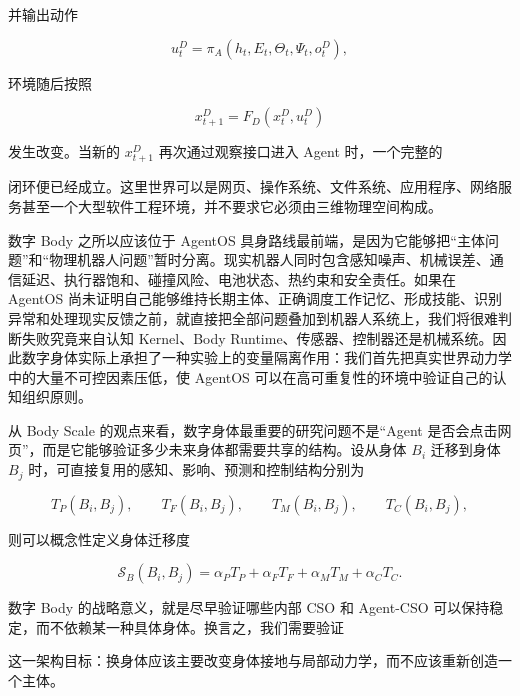 并输出动作

$$
u_t^{D}=\pi_A(h_t,E_t,\Theta_t,\Psi_t,o_t^{D}),
$$

环境随后按照

$$
x_{t+1}^{D}=F_D(x_t^{D},u_t^{D})
$$

发生改变。当新的 $x_{t+1}^{D}$ 再次通过观察接口进入 Agent 时，一个完整的

\begin{statementbox}
\centering
{}
\end{statementbox}

闭环便已经成立。这里世界可以是网页、操作系统、文件系统、应用程序、网络服务甚至一个大型软件工程环境，并不要求它必须由三维物理空间构成。

数字 Body 之所以应该位于 AgentOS 具身路线最前端，是因为它能够把“主体问题”和“物理机器人问题”暂时分离。现实机器人同时包含感知噪声、机械误差、通信延迟、执行器饱和、碰撞风险、电池状态、热约束和安全责任。如果在 AgentOS 尚未证明自己能够维持长期主体、正确调度工作记忆、形成技能、识别异常和处理现实反馈之前，就直接把全部问题叠加到机器人系统上，我们将很难判断失败究竟来自认知 Kernel、Body Runtime、传感器、控制器还是机械系统。因此数字身体实际上承担了一种实验上的变量隔离作用：我们首先把真实世界动力学中的大量不可控因素压低，使 AgentOS 可以在高可重复性的环境中验证自己的认知组织原则。

从 Body Scale 的观点来看，数字身体最重要的研究问题不是“Agent 是否会点击网页”，而是它能够验证多少未来身体都需要共享的结构。设从身体 $B_i$ 迁移到身体 $B_j$ 时，可直接复用的感知、影响、预测和控制结构分别为

$$
T_P(B_i,B_j),\qquad
T_F(B_i,B_j),\qquad
T_M(B_i,B_j),\qquad
T_C(B_i,B_j),
$$

则可以概念性定义身体迁移度

$$
\mathcal S_B(B_i,B_j)
=
\alpha_P T_P+
\alpha_F T_F+
\alpha_M T_M+
\alpha_C T_C.
$$

数字 Body 的战略意义，就是尽早验证哪些内部 CSO 和 Agent-CSO 可以保持稳定，而不依赖某一种具体身体。换言之，我们需要验证

\begin{statementbox}
\centering
{}
\end{statementbox}

这一架构目标：换身体应该主要改变身体接地与局部动力学，而不应该重新创造一个主体。

